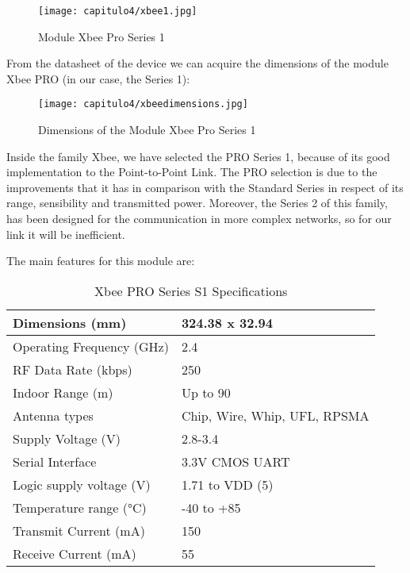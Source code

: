\begin{figure}[H]
	\centering
		\texttt{[image: capitulo4/xbee1.jpg]}
	\caption{Module Xbee Pro Series 1}
	\label{fig:xbee1}
\end{figure}

From the datasheet of the device we can acquire the dimensions of the module Xbee PRO (in our case, the Series 1):

\begin{figure}[H]
	\centering
		\texttt{[image: capitulo4/xbeedimensions.jpg]}
	\caption{Dimensions of the Module Xbee Pro Series 1}
	\label{fig:xbeedimensions}
\end{figure}

Inside the family Xbee, we have selected the PRO Series 1, because of its good implementation to the Point-to-Point Link. The PRO selection is due to the improvements that it has in comparison with the Standard Series in respect of its range, sensibility and transmitted power. Moreover, the Series 2 of this family, has been designed for the communication in more complex networks, so for our link it will be inefficient. \cite{carlos}

The main features for this module are:

\begin{table}[H]
\centering
\begin{tabular}{|l|l|}
\hline
Dimensions (mm) & 324.38 x 32.94 \\ \hline
Operating Frequency        (GHz)     & 2.4     \\ \hline
RF Data Rate     (kbps)         &  250         \\ \hline
Indoor Range (m)          & Up to 90     \\ \hline
Antenna types        &  Chip, Wire, Whip, UFL, RPSMA                         \\ \hline
Supply Voltage (V) & 2.8-3.4                                      \\ \hline
Serial Interface     &  3.3V CMOS UART        \\ \hline
Logic supply voltage (V)     & 1.71 to VDD (5)         \\ \hline
Temperature range (°C)  & -40 to +85                                          \\ \hline
Transmit Current (mA)  & 150                                          \\ \hline
Receive Current (mA) & 55                                        \\ \hline
\end{tabular}
\caption{Xbee PRO Series S1  Specifications \cite{xbee} }\label{tab:XBEEtab}
\end{table}

